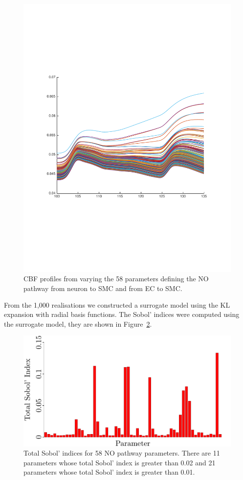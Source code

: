 \documentclass{article}
\begin{document}
\begin{figure}[h!]
\centering
\includegraphics[width=0.8\linewidth]{./Figures/CBF_Vary_NO_Pathway}
\caption{CBF profiles from varying the 58 parameters defining the NO pathway from neuron to SMC and from EC to SMC.}
\label{fig:CBF_Vary_NO_Pathway}
\end{figure}

 From the 1,000 realisations we constructed a surrogate model using the KL expansion with radial basis functions. The Sobol' indices were computed using the surrogate model, they are shown in Figure~\ref{fig:NO_pathway_all_parameters}.

\begin{figure}[h]
\begin{center}
\includegraphics[scale=.25]{Figures/NO_Pathway_All_Parameters.pdf}
\end{center}
\caption{Total Sobol' indices for 58 NO pathway parameters. There are 11 parameters whose total Sobol' index is greater than 0.02 and 21 parameters whose total Sobol' index is greater than 0.01.}
\label{fig:NO_pathway_all_parameters}
\end{figure}
\end{document}
